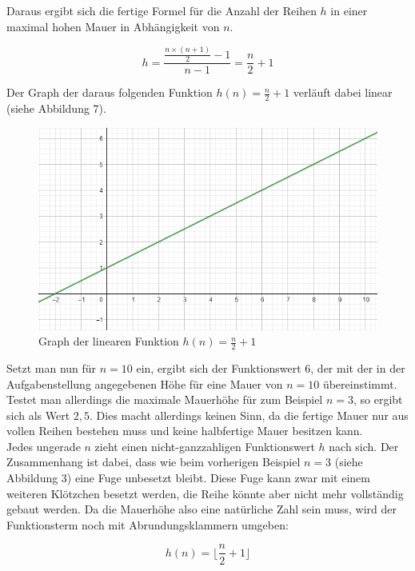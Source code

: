 \documentclass[a4paper,12pt]{article}
\begin{document}
Daraus ergibt sich die fertige Formel für die Anzahl der Reihen $h$ in einer maximal hohen Mauer in Abhängigkeit von $n$.
\begin{center}
\begin{Large}
\[h = \frac{\frac{n\times(n+1)}{2}-1}{n-1} = \frac{n}{2}+1\]
\end{Large}
\end{center}

Der Graph der daraus folgenden Funktion $h(n) = \frac{n}{2}+1$ verläuft dabei linear (siehe Abbildung 7).
\begin{figure}[H]
    \centering
    \includegraphics[width=0.95\linewidth]{Bilder/Aufgabe1/Graph_01.png}
    \caption{Graph der linearen Funktion $h(n) = \frac{n}{2}+1$}
\end{figure}
Setzt man nun für $n = 10$ ein, ergibt sich der Funktionswert $6$, der mit der in der Aufgabenstellung angegebenen Höhe für eine Mauer von $n = 10$ übereinstimmt.
Testet man allerdings die maximale Mauerhöhe für zum Beispiel $n = 3$, so ergibt sich als Wert $2,5$. Dies macht allerdings keinen Sinn, da die fertige Mauer nur aus vollen Reihen bestehen muss und keine halbfertige Mauer besitzen kann.
\\[0.4cm]
Jedes ungerade $n$ zieht einen nicht-ganzzahligen Funktionswert $h$ nach sich. Der Zusammenhang ist dabei, dass wie beim vorherigen Beispiel $n = 3$ (siehe Abbildung 3) eine Fuge unbesetzt bleibt. Diese Fuge kann zwar mit einem weiteren Klötzchen besetzt werden, die Reihe könnte aber nicht mehr vollständig gebaut werden.
Da die Mauerhöhe also eine natürliche Zahl sein muss, wird der Funktionsterm noch mit Abrundungsklammern umgeben:
\begin{center}
\begin{Large}
\[h(n) = \lfloor\frac{n}{2}+1\rfloor\]
\end{Large}
\end{center}
\end{document}
